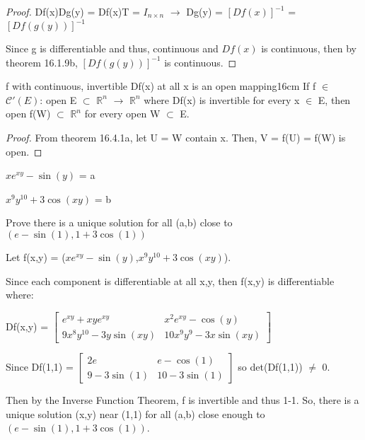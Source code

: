 \begin{proof}
        \hspace{0.5cm}
        Df(x)Dg(y) = Df(x)T = $I_{n \times n}$
        \hspace{0.5cm}
        $\rightarrow$
        \hspace{0.5cm}
        Dg(y) = $[Df(x)]^{-1}$
        = $[Df(g(y))]^{-1}$

        Since g is differentiable and thus, continuous and $Df(x)$
        is continuous, then by {\color{red} theorem 16.1.9b},
        $[Df(g(y))]^{-1}$ is continuous.
    \end{proof}

    \vspace{0.5cm}



    \begin{corollary}{f with continuous, invertible Df(x) at all x is
    an open mapping}{16cm}
        If f $\in$ $\mathscr{C}'(E)$: open E $\subset$ $\mathbb{R}^n$
        $\rightarrow$ $\mathbb{R}^n$ where Df(x) is invertible for every x
        $\in$ E, then open f(W) $\subset$ $\mathbb{R}^n$ for
        every open W $\subset$ E.
    \end{corollary}

    \begin{proof}
        From {\color{red} theorem 16.4.1a}, let U = W contain x.
        Then, V = f(U) = f(W) is open.
    \end{proof}

    \newpage



    \begin{example}
        $xe^{xy} - \sin(y)$ = a

        $x^9 y^{10} + 3\cos(xy)$ = b

        Prove there is a unique solution for all (a,b)
        close to $(e-\sin(1),1+3\cos(1))$
    \end{example}

    \begin{tbox}
        Let f(x,y) = ($xe^{xy} - \sin(y)$,$x^9 y^{10} + 3\cos(xy)$).

        Since each component is differentiable at all x,y, then
        f(x,y) is differentiable where:

        \hspace{0.5cm}
        Df(x,y) =
        $\begin{bmatrix}
            e^{xy} + xye^{xy} & x^2e^{xy} - \cos(y) \\
            9x^8y^{10} - 3y\sin(xy) & 10x^9y^9 - 3x \sin(xy)
        \end{bmatrix}$

        Since Df(1,1) =
        $\begin{bmatrix}
            2e & e - \cos(1) \\
            9 - 3\sin(1) & 10 - 3\sin(1)
        \end{bmatrix}$
        so det(Df(1,1)) $\not =$ 0.

        Then by the Inverse Function Theorem, f is invertible
        and thus 1-1. So, there is a unique solution (x,y)
        near (1,1) for all (a,b)
        close enough to $(e-\sin(1),1+3\cos(1))$.
    \end{tbox}

